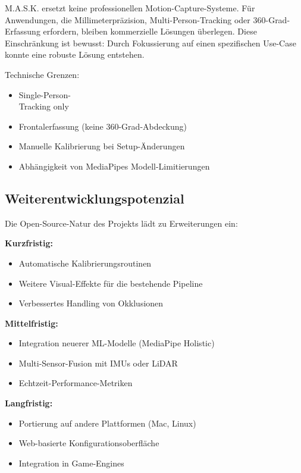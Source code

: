 M.A.S.K. ersetzt keine professionellen Motion-Capture-Systeme. Für Anwendungen, die Millimeterpräzision, Multi-Person-Tracking oder 360-Grad-Erfassung erfordern, bleiben kommerzielle Lösungen überlegen. Diese Einschränkung ist bewusst: Durch Fokussierung auf einen spezifischen Use-Case konnte eine robuste Lösung entstehen.

Technische Grenzen:
\begin{itemize}
    \item Single-Person-\\Tracking only
    \item Frontalerfassung (keine 360-Grad-Abdeckung)
    \item Manuelle Kalibrierung bei Setup-Änderungen
    \item Abhängigkeit von MediaPipes Modell-Limitierungen
\end{itemize}

\subsection{Weiterentwicklungspotenzial}

Die Open-Source-Natur des Projekts lädt zu Erweiterungen ein:

\textbf{Kurzfristig:}
\begin{itemize}
    \item Automatische Kalibrierungsroutinen
    \item Weitere Visual-Effekte für die bestehende Pipeline
    \item Verbessertes Handling von Okklusionen
\end{itemize}

\textbf{Mittelfristig:}
\begin{itemize}
    \item Integration neuerer ML-Modelle (MediaPipe Holistic)
    \item Multi-Sensor-Fusion mit IMUs oder LiDAR
    \item Echtzeit-Performance-Metriken
\end{itemize}

\textbf{Langfristig:}
\begin{itemize}
    \item Portierung auf andere Plattformen (Mac, Linux)
    \item Web-basierte Konfigurationsoberfläche
    \item Integration in Game-Engines
\end{itemize}


